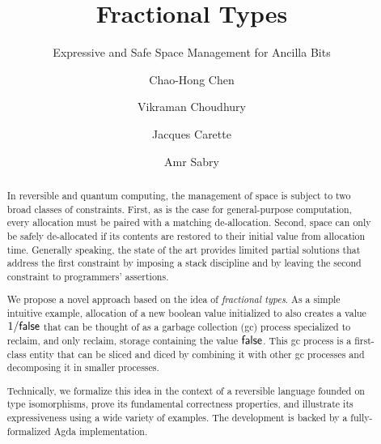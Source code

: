 \documentclass[sigplan,10pt,review,anonymous]{acmart}
\newcommand{\oneover}[1]{1/#1}
\begin{document}
\title{Fractional Types}
\subtitle{Expressive and Safe Space Management for Ancilla Bits}
\author{Chao-Hong Chen}

\author{Vikraman Choudhury}

\author{Jacques Carette}

\author{Amr Sabry}

\begin{abstract}
  In reversible and quantum computing, the management of space is
  subject to two broad classes of constraints. First, as is the case
  for general-purpose computation, every allocation must be paired
  with a matching de-allocation. Second, space can only be safely
  de-allocated if its contents are restored to their initial value
  from allocation time. Generally speaking, the state of the art
  provides limited partial solutions that address the first
  constraint by imposing a stack discipline and by leaving the second
  constraint to programmers' assertions.

  We propose a novel approach based on the idea of \emph{fractional
    types}. As a simple intuitive example, allocation of a new boolean
  value initialized to  also creates a value
  $\oneover{\AgdaInductiveConstructor{false}}$ that can be thought of as a garbage
  collection (gc) process specialized to reclaim, and only reclaim,
  storage containing the value $\AgdaInductiveConstructor{false}$. This gc process is a
  first-class entity that can be sliced and diced by combining it with
  other gc processes and decomposing it in smaller
  processes.

  Technically, we formalize this idea in the context of a reversible
  language founded on type isomorphisms, prove its fundamental
  correctness properties, and illustrate its expressiveness using a
  wide variety of examples. The development is backed by a
  fully-formalized Agda implementation.
\end{abstract}

\maketitle






\end{document}

